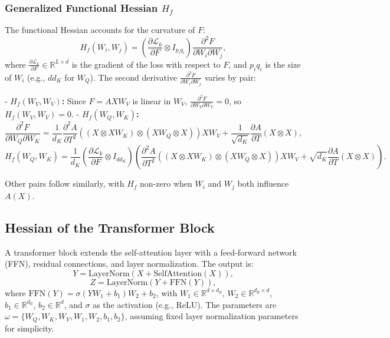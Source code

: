\documentclass{article}
\begin{document}
\subsubsection{Generalized Functional Hessian \( H_f \)}
The functional Hessian accounts for the curvature of \( F \):
\[
H_f(W_i, W_j) = \left( \frac{\partial \mathcal{L}_k}{\partial F} \otimes I_{p_i q_i} \right) \frac{\partial^2 F}{\partial W_i \partial W_j},
\]
where \( \frac{\partial \mathcal{L}_k}{\partial F} \in \mathbb{R}^{L \times d} \) is the gradient of the loss with respect to \( F \), and \( p_i q_i \) is the size of \( W_i \) (e.g., \( d d_K \) for \( W_Q \)). The second derivative \( \frac{\partial^2 F}{\partial W_i \partial W_j} \) varies by pair:

- \textbf{\( H_f(W_V, W_V) \):} Since \( F = A X W_V \) is linear in \( W_V \), \( \frac{\partial^2 F}{\partial W_V \partial W_V} = 0 \), so \( H_f(W_V, W_V) = 0 \).
- \textbf{\( H_f(W_Q, W_K) \):} 
\[
\frac{\partial^2 F}{\partial W_Q \partial W_K} = \frac{1}{d_K} \frac{\partial^2 A}{\partial T^2} \left( (X \otimes X W_K) \otimes (X W_Q \otimes X) \right) X W_V + \frac{1}{\sqrt{d_K}} \frac{\partial A}{\partial T} (X \otimes X),
\]
\[
H_f(W_Q, W_K) = \frac{1}{d_K} \left( \frac{\partial \mathcal{L}_k}{\partial F} \otimes I_{d d_K} \right) \left( \frac{\partial^2 A}{\partial T^2} \left( (X \otimes X W_K) \otimes (X W_Q \otimes X) \right) X W_V + \sqrt{d_K} \frac{\partial A}{\partial T} (X \otimes X) \right).
\]

Other pairs follow similarly, with \( H_f \) non-zero when \( W_i \) and \( W_j \) both influence \( A(X) \).

\subsection{Hessian of the Transformer Block}\label{subsec:hessian_transformer_block}

A transformer block extends the self-attention layer with a feed-forward network (FFN), residual connections, and layer normalization. The output is:
\[
Y = \text{LayerNorm}(X + \text{SelfAttention}(X)),
\]
\[
Z = \text{LayerNorm}(Y + \text{FFN}(Y)),
\]
where \( \text{FFN}(Y) = \sigma(Y W_1 + b_1) W_2 + b_2 \), with \( W_1 \in \mathbb{R}^{d \times d_{\text{ff}}} \), \( W_2 \in \mathbb{R}^{d_{\text{ff}} \times d} \), \( b_1 \in \mathbb{R}^{d_{\text{ff}}} \), \( b_2 \in \mathbb{R}^{d} \), and \( \sigma \) as the activation (e.g., ReLU). The parameters are \( \omega = \{W_Q, W_K, W_V, W_1, W_2, b_1, b_2\} \), assuming fixed layer normalization parameters for simplicity.
\end{document}
